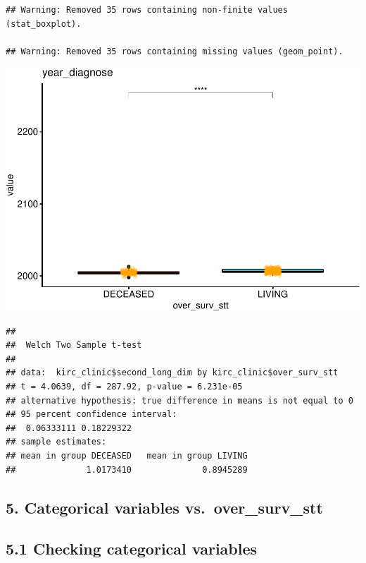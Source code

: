 \documentclass[]{article}
\newenvironment{Shaded}{\begin{snugshade}}{\end{snugshade}}
\newcommand{\KeywordTok}[1]{\textcolor[rgb]{0.13,0.29,0.53}{\textbf{#1}}}
\newcommand{\StringTok}[1]{\textcolor[rgb]{0.31,0.60,0.02}{#1}}
\newcommand{\OperatorTok}[1]{\textcolor[rgb]{0.81,0.36,0.00}{\textbf{#1}}}
\newcommand{\NormalTok}[1]{#1}
\begin{document}
\begin{verbatim}
## Warning: Removed 35 rows containing non-finite values (stat_boxplot).

## Warning: Removed 35 rows containing missing values (geom_point).
\end{verbatim}

\includegraphics{figs/render-unnamed-chunk-12-9.pdf}

\begin{Shaded}
\end{Shaded}

\begin{verbatim}
## 
##  Welch Two Sample t-test
## 
## data:  kirc_clinic$second_long_dim by kirc_clinic$over_surv_stt
## t = 4.0639, df = 287.92, p-value = 6.231e-05
## alternative hypothesis: true difference in means is not equal to 0
## 95 percent confidence interval:
##  0.06333111 0.18229322
## sample estimates:
## mean in group DECEASED   mean in group LIVING 
##              1.0173410              0.8945289
\end{verbatim}

\subsection{5. Categorical variables
vs.~over\_surv\_stt}\label{categorical-variables-vs.over_surv_stt}

\subsection{5.1 Checking categorical
variables}\label{checking-categorical-variables}
\end{document}
